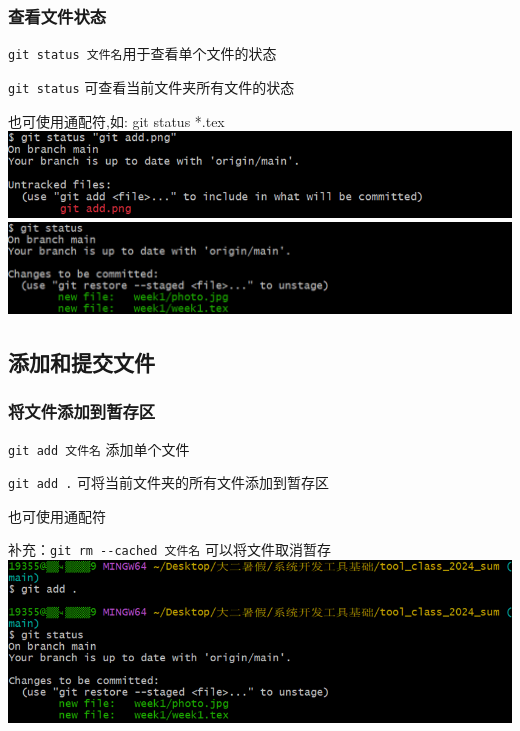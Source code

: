 \documentclass[UTF8,a4paper]{ctexart}
\begin{document}
\subsubsection{查看文件状态}
\verb|git status 文件名|\quad 用于查看单个文件的状态\par
\verb|git status| 可查看当前文件夹所有文件的状态\par
也可使用通配符,如: git status *.tex \\
\includegraphics[width=1\textwidth]{status1.png}\\
\includegraphics[width=1\textwidth]{status2.png}

\subsection{添加和提交文件}
\subsubsection{将文件添加到暂存区}

\verb|git add 文件名| \quad 添加单个文件\par 
\verb|git add .| 可将当前文件夹的所有文件添加到暂存区\par
也可使用通配符\par
补充：\verb|git rm --cached 文件名| \quad 可以将文件取消暂存\\
\includegraphics[width=1\textwidth]{git add.png}
\end{document}
